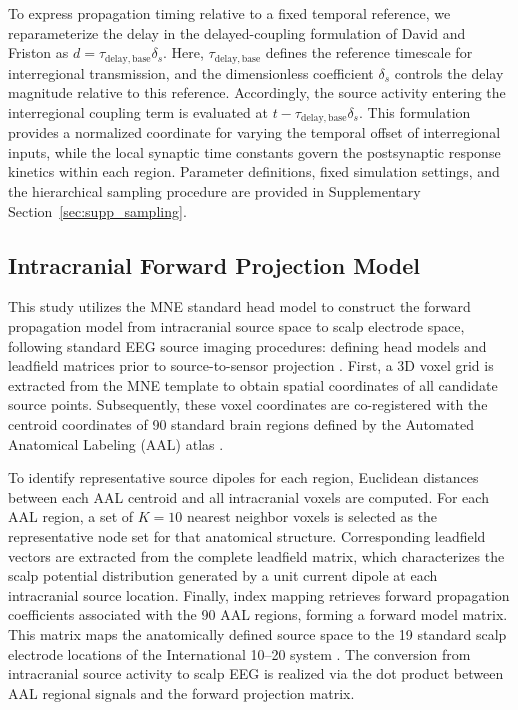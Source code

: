 \documentclass{article}
\begin{document}
To express propagation timing relative to a fixed temporal reference, we reparameterize the delay in the delayed-coupling formulation of David and Friston \citep{david2003modeling} as $d=\tau_{\mathrm{delay,base}}\delta_s$. Here, $\tau_{\mathrm{delay,base}}$ defines the reference
timescale for interregional transmission, and the dimensionless coefficient $\delta_s$ controls the delay magnitude relative to this reference. Accordingly, the source activity entering the interregional coupling term is evaluated at $t-\tau_{\mathrm{delay,base}}\delta_s$.
This formulation provides a normalized coordinate for varying the temporal offset of interregional inputs, while the local synaptic time constants govern the postsynaptic response kinetics within each region. Parameter definitions, fixed simulation settings, and the hierarchical sampling procedure are provided in Supplementary Section~\ref{sec:supp_sampling}.

\subsection{Intracranial Forward Projection Model}
\label{sec:forward_model}
This study utilizes the MNE standard head model \citep{gramfort2014mne} to construct the forward propagation model from intracranial source space to scalp electrode space, following standard EEG source imaging procedures: defining head models and leadfield matrices prior to source-to-sensor projection \citep{grech2008review,michel2019eegsource}. First, a 3D voxel grid is extracted from the MNE template to obtain spatial coordinates of all candidate source points. Subsequently, these voxel coordinates are co-registered with the centroid coordinates of 90 standard brain regions defined by the Automated Anatomical Labeling (AAL) atlas \citep{tzourio2002automated}. 

To identify representative source dipoles for each region, Euclidean distances between each AAL centroid and all intracranial voxels are computed. For each AAL region, a set of $K=10$ nearest neighbor voxels is selected as the representative node set for that anatomical structure. Corresponding leadfield vectors are extracted from the complete leadfield matrix, which characterizes the scalp potential distribution generated by a unit current dipole at each intracranial source location. Finally, index mapping retrieves forward propagation coefficients associated with the 90 AAL regions, forming a forward model matrix. This matrix maps the anatomically defined source space to the 19 standard scalp electrode locations of the International 10--20 system \citep{jasper1958ten}. The conversion from intracranial source activity to scalp EEG is realized via the dot product between AAL regional signals and the forward projection matrix.
\end{document}
